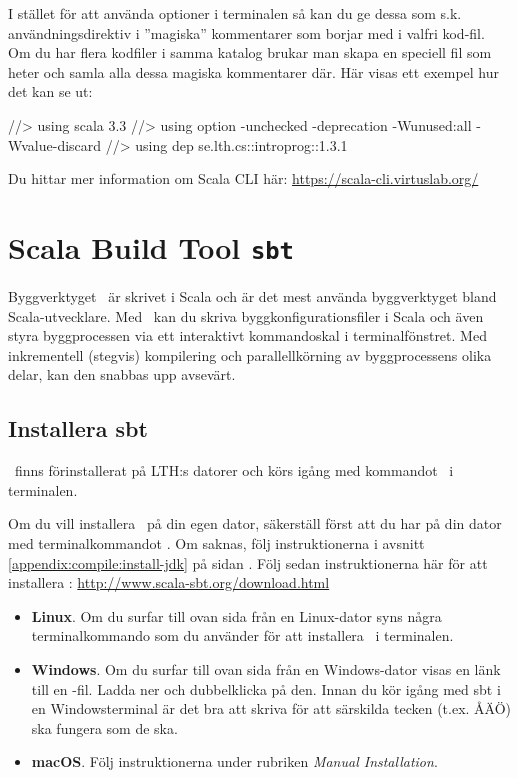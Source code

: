 \noindent I stället för att använda optioner i terminalen så kan du ge dessa som s.k. användningsdirektiv  i ''magiska'' kommentarer som borjar med  i valfri kod-fil. Om du har flera kodfiler i samma katalog brukar man skapa en speciell fil som heter  och samla alla dessa magiska kommentarer där. Här visas ett exempel hur det kan se ut:
\begin{Code}
//> using scala 3.3
//> using option -unchecked -deprecation -Wunused:all -Wvalue-discard
//> using dep se.lth.cs::introprog::1.3.1
\end{Code}

\noindent Du hittar mer information om Scala CLI här: \url{https://scala-cli.virtuslab.org/}



\section{Scala Build Tool \texttt{sbt}}\label{appendix:build:sbt}

Byggverktyget \sbt\ är skrivet i Scala och är det mest använda byggverktyget bland Scala-utvecklare. Med \sbt\ kan du skriva byggkonfigurationsfiler i Scala och även styra byggprocessen via ett interaktivt kommandoskal i terminalfönstret. Med inkrementell (stegvis) kompilering och parallellkörning av byggprocessens olika delar, kan den snabbas upp avsevärt.


\subsection{Installera sbt}

\sbt\ finns förinstallerat på LTH:s datorer och körs igång med kommandot \sbt\ i terminalen.

Om du vill installera \sbt\ på din egen dator,
säkerställ först att du har  på din dator med terminalkommandot . Om  saknas, följ instruktionerna i avsnitt \ref{appendix:compile:install-jdk} på sidan \pageref{appendix:compile:install-jdk}.
Följ sedan instruktionerna här för att installera \sbt: \url{http://www.scala-sbt.org/download.html}

\begin{itemize}

\item \textbf{Linux}. Om du surfar till ovan sida från en Linux-dator syns några terminalkommando som du använder för att installera \sbt\ i terminalen.

\item \textbf{Windows}. Om du surfar till ovan sida från en Windows-dator visas en länk till en -fil. Ladda ner och dubbelklicka på den. Innan du kör igång med sbt i en Windowsterminal är det bra att skriva  för att särskilda tecken (t.ex. ÅÄÖ) ska fungera som de ska.

\item \textbf{macOS}. Följ instruktionerna under rubriken \textit{Manual Installation}.

\end{itemize}

